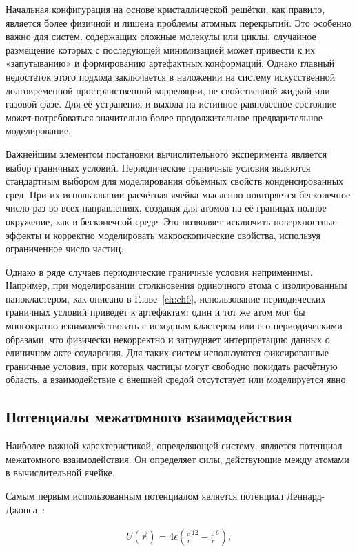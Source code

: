 Начальная конфигурация на основе кристаллической решётки, как правило, является более физичной и лишена проблемы атомных перекрытий. Это особенно важно для систем, содержащих сложные молекулы или циклы, случайное размещение которых с последующей минимизацией может привести к их «запутыванию» и формированию артефактных конформаций. Однако главный недостаток этого подхода заключается в наложении на систему искусственной долговременной пространственной корреляции, не свойственной жидкой или газовой фазе. Для её устранения и выхода на истинное равновесное состояние может потребоваться значительно более продолжительное предварительное моделирование.

Важнейшим элементом постановки вычислительного эксперимента является выбор граничных условий. Периодические граничные условия являются стандартным выбором для моделирования объёмных свойств конденсированных сред. При их использовании расчётная ячейка мысленно повторяется бесконечное число раз во всех направлениях, создавая для атомов на её границах полное окружение, как в бесконечной среде. Это позволяет исключить поверхностные эффекты и корректно моделировать макроскопические свойства, используя ограниченное число частиц.

Однако в ряде случаев периодические граничные условия неприменимы. Например, при моделировании столкновения одиночного атома с изолированным нанокластером, как описано в Главе~\cref{ch:ch6}, использование периодических граничных условий приведёт к артефактам: один и тот же атом мог бы многократно взаимодействовать с исходным кластером или его периодическими образами, что физически некорректно и затрудняет интерпретацию данных о единичном акте соударения. Для таких систем используются фиксированные граничные условия, при которых частицы могут свободно покидать расчётную область, а взаимодействие с внешней средой отсутствует или моделируется явно.

\subsection{Потенциалы межатомного взаимодействия}

Наиболее важной характеристикой, определяющей систему, является потенциал межатомного взаимодействия. Он определяет силы, действующие между атомами в вычислительной ячейке.

Самым первым использованным потенциалом является потенциал Леннард-Джонса~\cite{Lennard-Jones_1924}:

\begin{align}
	U(\overrightarrow{r}) = 4 \epsilon (\frac{\sigma}{r}^{12}-\frac{\sigma}{r}^6),
\end{align}

